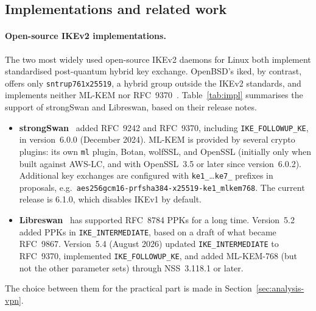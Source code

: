 \subsection{Implementations and related work}
\label{sec:sota-impl}

\paragraph{Open-source IKEv2 implementations.}
The two most widely used open-source IKEv2 daemons for Linux both implement
standardised post-quantum hybrid key exchange. OpenBSD's iked, by contrast,
offers only \texttt{sntrup761\allowbreak x25519}, a hybrid group outside the
IKEv2 standards, and implements neither ML-KEM nor RFC~9370~\cite{openbsdIked}.
Table~\ref{tab:impl} summarises the support of strongSwan and Libreswan, based
on their release notes.
\begin{itemize}
    \item \textbf{strongSwan}~\cite{strongswan} added RFC~9242 and RFC~9370,
    including \texttt{IKE\_FOLLOWUP\_KE}, in version~6.0.0 (December 2024).
    ML-KEM is provided by several crypto plugins: its own \texttt{ml} plugin,
    Botan, wolfSSL, and OpenSSL (initially only when built against AWS-LC,
    and with OpenSSL~3.5 or later since version~6.0.2). Additional key
    exchanges are configured with \texttt{ke1\_}\ldots\texttt{ke7\_} prefixes
    in proposals, e.g.\ \texttt{aes256gcm16-prfsha384-x25519-ke1\_mlkem768}.
    The current release is 6.1.0, which disables IKEv1 by default.
    \item \textbf{Libreswan}~\cite{libreswan} has supported RFC~8784 PPKs for
    a long time. Version~5.2 added PPKs in \texttt{IKE\_INTERMEDIATE}, based
    on a draft of what became RFC~9867. Version~5.4 (August 2026) updated
    \texttt{IKE\_INTERMEDIATE} to RFC~9370, implemented
    \texttt{IKE\_FOLLOWUP\_KE}, and added ML-KEM-768 (but not the other
    parameter sets) through NSS~3.118.1 or later.
\end{itemize}
The choice between them for the practical part is made in
Section~\ref{sec:analysis-vpn}.

